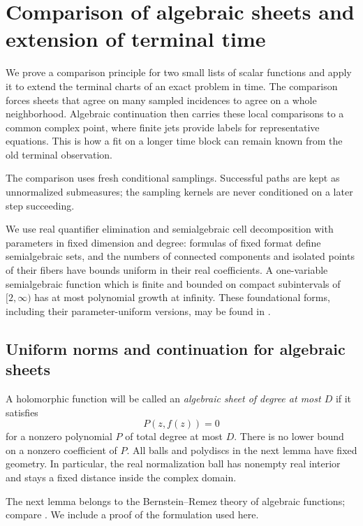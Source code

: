 \section{Comparison of algebraic sheets and extension of terminal time}
\label{sec:comparison}

We prove a comparison principle for two small lists of scalar functions
and apply it to extend the terminal charts of an exact problem in time.
The comparison forces sheets that agree on many sampled incidences to
agree on a whole neighborhood.  Algebraic continuation then carries
these local comparisons to a common complex point, where finite jets
provide labels for representative equations.  This is how a fit on a
longer time block can remain known from the old terminal observation.

The comparison uses fresh conditional samplings.  Successful paths are
kept as unnormalized submeasures; the sampling kernels are never
conditioned on a later step succeeding.

We use real quantifier elimination and semialgebraic cell decomposition
with parameters in fixed dimension and degree: formulas of fixed format
define semialgebraic sets, and the numbers of connected components and
isolated points of their fibers have bounds uniform in their real
coefficients.  A one-variable semialgebraic function which is finite and
bounded on compact subintervals of \([2,\infty)\) has at most polynomial
growth at infinity.  These foundational forms, including their
parameter-uniform versions, may be found in
\citet[Chapters~3, 5, 7, and 14]{BasuPollackRoy}.

\subsection{Uniform norms and continuation for algebraic sheets}

A holomorphic function will be called an \emph{algebraic sheet of degree at
most \(D\)} if it satisfies
\[
 P(z,f(z))=0
\]
for a nonzero polynomial \(P\) of total degree at most \(D\).
There is no lower bound on a nonzero coefficient of \(P\).
All balls and polydiscs in the next lemma have fixed geometry.  In particular,
the real normalization ball has nonempty real interior and stays a fixed
distance inside the complex domain.

The next lemma belongs to the Bernstein--Remez theory of algebraic
functions; compare \citet[Sections~3.3--3.5]{RoytwarfYomdin1997}.
We include a proof of the formulation used here.


